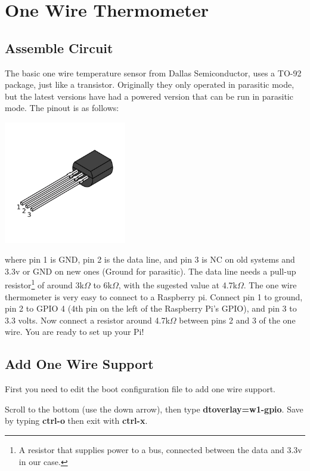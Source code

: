 \chapter{One Wire Thermometer}

\section{Assemble Circuit}

The basic one wire temperature sensor from Dallas Semiconductor, uses a TO-92 package, just like a transistor.  Originally they only operated in parasitic mode, but the latest versions have had a powered version that can be run in parasitic mode. The pinout is as follows:

\includegraphics[width=0.4\textwidth]{../images/TO-92-Package.png}

where pin 1 is GND, pin 2 is the data line, and pin 3 is NC on old systems and 3.3v or GND on new ones (Ground for parasitic).  The data line needs a pull-up resistor\footnote{A resistor that supplies power to a bus, connected between the data and 3.3v in our case.} of around 3k$\Omega$ to 6k$\Omega$, with the sugested value at 4.7k$\Omega$. The one wire thermometer is very easy to connect to a Raspberry pi.  Connect pin 1 to ground, pin 2 to GPIO 4 (4th pin on the left of the Raspberry Pi's GPIO), and pin 3 to 3.3 volts.  Now connect a resistor around 4.7k$\Omega$ between pins 2 and 3 of the one wire.  You are ready to set up your Pi!

\section{Add One Wire Support}

First you need to edit the boot configuration file to add one wire support.


Scroll to the bottom (use the down arrow), then type \textbf{dtoverlay=w1-gpio}.
Save by typing \textbf{ctrl-o} then exit with \textbf{ctrl-x}.

